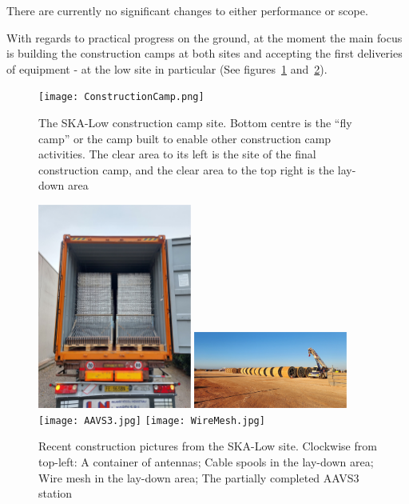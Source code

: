 \documentclass[a4paper,
               biblatex,     %
               keeplastbox,   %
               ]{jacow}
\begin{document}
There are currently no significant changes to either performance or scope.

With regards to practical progress on the ground, at the moment the main focus is building the construction camps at both sites and accepting the first deliveries of equipment - at the low site in particular (See figures~\ref{fig:low-camp} and~\ref{fig:low-construction}).

\begin{figure}[tb]
	\centering
  \texttt{[image: ConstructionCamp.png]}    
	\caption{The SKA-Low construction camp site. Bottom centre is the ``fly camp'' or the camp built to enable other construction camp activities. The clear area to its left is the site of the final construction camp, and the clear area to the top right is the lay-down area}
	\label{fig:low-camp}
\end{figure}


\begin{figure}[tb]
	\centering
  \includegraphics[width=0.45\textwidth]{Packed Antennas.jpg}
  \includegraphics[width=0.45\textwidth]{Cables.jpg}\\
  \texttt{[image: AAVS3.jpg]}
  \texttt{[image: WireMesh.jpg]}
    
	\caption{Recent construction pictures from the SKA-Low site. Clockwise from top-left: A container of antennas; Cable spools in the lay-down area; Wire mesh in the lay-down area; The partially completed AAVS3 station
	}
	\label{fig:low-construction}
  \end{figure}
\end{document}
